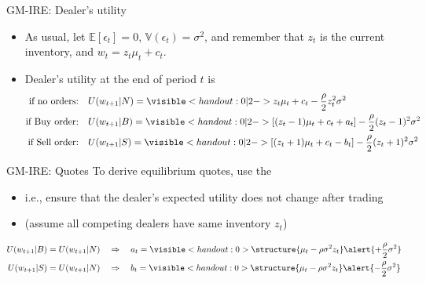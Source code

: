 \documentclass[english,10pt
,aspectratio=169
]{beamer}
\begin{document}
\begin{frame}{GM-IRE: Dealer's utility}
	\begin{itemize}
		\item As usual, let $\mathbb{E}[\epsilon_t] = 0$, $\mathbb{V}(\epsilon_t) = \sigma^2$, and remember that $z_t$ is the current inventory, and $w_t = z_t \mu_t + c_t$.
		\item Dealer's utility at the end of period $t$ is
		\begin{align*}
			\text{if no orders:}\quad & U(w_{t+1}|N) = \visible<handout:0|2->{ z_t \mu_t + c_t - \frac{\rho}{2}z_t^2 \sigma^2 }
			\\
			\text{if Buy order:}\quad & U(w_{t+1}|B) = \visible<handout:0|2->{ \left[(z_t-1)\mu_t + c_t + a_t\right] - \frac{\rho}{2}(z_t-1)^2 \sigma^2 }
			\\
			\text{if Sell order:}\quad & U(w_{t+1}|S) = \visible<handout:0|2->{ \left[(z_t+1)\mu_t + c_t - b_t\right] - \frac{\rho}{2}(z_t+1)^2 \sigma^2 }
		\end{align*}
	\end{itemize}
\end{frame}


\begin{frame}{GM-IRE: Quotes}
	To derive equilibrium \alert{quotes}, use the 
	\begin{itemize}
		\item i.e., ensure that the dealer's expected utility does not change after trading
		\item (assume all competing dealers have same inventory $z_t$)
	\end{itemize}
		\begin{align*}
			U(w_{t+1}|B)=U(w_{t+1}|N) \quad & \Rightarrow \quad a_t = \visible<handout:0>{ \structure{\mu_t - \rho \sigma^2 z_t} \alert{+ \frac{\rho}{2} \sigma^2} }
			\\
			U(w_{t+1}|S)=U(w_{t+1}|N) \quad & \Rightarrow \quad b_t = \visible<handout:0>{ \structure{\mu_t - \rho \sigma^2 z_t} \alert{- \frac{\rho}{2} \sigma^2} }
		\end{align*}
\end{frame}
\end{document}
